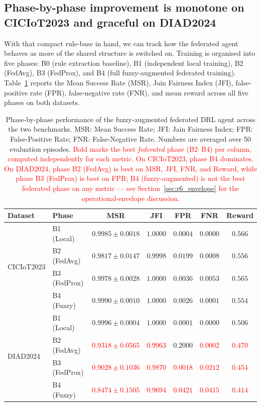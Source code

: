 \documentclass[journal]{IEEEtran}
\newcommand{\rev}[1]{\textcolor{red}{#1}}
\begin{document}
\subsection{Phase-by-phase improvement is monotone on CICIoT2023 and
graceful on DIAD2024}\label{sec:r3_phases}

With that compact rule-base in hand, we can track how the federated
agent behaves as more of the shared structure is switched on.
Training is organised into five phases: B0 (rule extraction
baseline), B1 (independent local training), B2 (FedAvg), B3
(FedProx), and B4 (full fuzzy-augmented federated training).
Table~\ref{tab:phase_msr} reports the Mean Success Rate (MSR), Jain
Fairness Index (JFI), false-positive rate (FPR), false-negative
rate (FNR), and mean reward across all five phases on both
datasets.

\begin{table}[!htbp]
  \centering
  \caption{Phase-by-phase performance of the fuzzy-augmented federated
  DRL agent across the two benchmarks. MSR: Mean Success Rate; JFI: Jain
  Fairness Index; FPR: False-Positive Rate; FNR: False-Negative Rate.
  Numbers are averaged over 50 evaluation episodes. \rev{Bold marks the best \emph{federated} phase (B2--B4) per column, computed independently for each metric. On CICIoT2023, phase B4 dominates. On DIAD2024, phase B2 (FedAvg) is best on MSR, JFI, FNR, and Reward, while phase B3 (FedProx) is best on FPR; B4 (fuzzy-augmented) is not the best federated phase on any metric --- see Section~\ref{sec:r6_envelope} for the operational-envelope discussion.}}\label{tab:phase_msr}
  \small
  \begin{tabular}{@{}llccccc@{}}
    \toprule
    \textbf{Dataset} & \textbf{Phase} & \textbf{MSR} & \textbf{JFI} & \textbf{FPR} & \textbf{FNR} & \textbf{Reward} \\
    \midrule
    \multirow{4}{*}{CICIoT2023}
      & B1 (Local)   & $0.9985\pm0.0018$ & $1.0000$ & $0.0004$ & $0.0000$ & $0.566$ \\
      & B2 (FedAvg)  & $0.9817\pm0.0147$ & $0.9998$ & $0.0199$ & $0.0008$ & $0.556$ \\
      & B3 (FedProx) & $0.9978\pm0.0028$ & $1.0000$ & $0.0036$ & $0.0053$ & $0.565$ \\
      & B4 (Fuzzy)   & $\mathbf{0.9990\pm0.0010}$ & $\mathbf{1.0000}$ & $\mathbf{0.0026}$ & $\mathbf{0.0001}$ & $0.554$ \\
    \midrule
    \multirow{4}{*}{DIAD2024}
      & B1 (Local)   & $0.9996\pm0.0004$ & $1.0000$ & $0.0001$ & $0.0000$ & $0.506$ \\
      & B2 (FedAvg)  & \rev{$\mathbf{0.9318\pm0.0565}$} & \rev{$\mathbf{0.9963}$} & $0.2000$ & \rev{$\mathbf{0.0002}$} & \rev{$\mathbf{0.470}$} \\
      & B3 (FedProx) & \rev{$0.9028\pm0.1036$} & \rev{$0.9870$} & \rev{$\mathbf{0.0018}$} & \rev{$0.0212$} & \rev{$0.454$} \\
      & B4 (Fuzzy)   & \rev{$0.8474\pm0.1505$} & \rev{$0.9694$} & \rev{$0.0421$} & \rev{$0.0415$} & \rev{$0.414$} \\
    \bottomrule
  \end{tabular}
\end{table}
\end{document}
